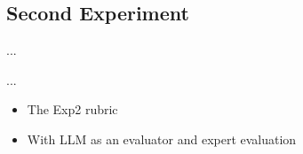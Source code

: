 

\subsection{Second Experiment}
\label{sec:second-experiment}

 ...



...


\begin{itemize}
    \item The Exp2 rubric
    \item With LLM as an evaluator and expert evaluation
\end{itemize}


\vp